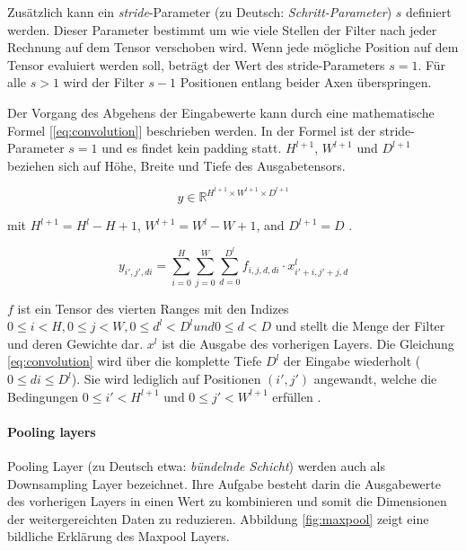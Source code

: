 Zusätzlich kann ein \textit{stride}-Parameter (zu Deutsch: \textit{Schritt-Parameter}) $s$ definiert werden. Dieser Parameter bestimmt um wie viele Stellen der Filter nach jeder Rechnung auf dem Tensor verschoben wird. Wenn jede mögliche Position auf dem Tensor evaluiert werden soll, beträgt der Wert des stride-Parameters $s=1$. Für alle $s > 1$ wird der Filter $s - 1$ Positionen entlang beider Axen überspringen.

Der Vorgang des Abgehens der Eingabewerte kann durch eine mathematische Formel [\ref{eq:convolution}] beschrieben werden. In der Formel ist der stride-Parameter $s=1$ und es findet kein padding statt. $H^{l+1}$, $W^{l+1}$ und $D^{l+1}$ beziehen sich auf Höhe, Breite und Tiefe des Ausgabetensors.
 
\begin{equation}
y \in \mathbb{R}^{H^{l+1} \times W^{l+1} \times D^{l+1}}
\end{equation}

mit $H^{l+1} = H^l - H + 1$, $W^{l+1} = W^l - W + 1$, and $D^{l+1} = D$ \parencite{Wu.2017}.


\begin{equation}
\label{eq:convolution}
y_{i',j',di} = \sum_{i=0}^{H}\sum_{j=0}^{W}\sum_{d =0}^{D^l} f_{i,j,d,di} \cdot x^{l}_{i'+i, j'+j, d}
\end{equation}

$f$ ist ein Tensor des vierten Ranges mit den Indizes $ 0 \leq i < H,0 \leq j < W, 0 \leq d^l < D^l und 0 \leq d < D$ und stellt die Menge der Filter und deren Gewichte dar. $x^l$ ist die Ausgabe des vorherigen Layers. Die Gleichung \ref{eq:convolution} wird \"uber die komplette Tiefe $D^l$ der Eingabe wiederholt ($0 \leq di \leq D^l$). Sie wird lediglich auf Positionen $(i',j')$ angewandt, welche die Bedingungen $0 \leq i' < H^{l + 1}$ und $0 \leq j' < W^{l + 1}$ erfüllen \parencite{Wu.2017}.

\paragraph{Pooling layers}

Pooling Layer (zu Deutsch etwa: \textit{bündelnde Schicht}) werden auch als Downsampling Layer bezeichnet. Ihre Aufgabe besteht darin die Ausgabewerte des vorherigen Layers in einen Wert zu kombinieren und somit die Dimensionen der weitergereichten Daten zu reduzieren. Abbildung \ref{fig:maxpool} zeigt eine bildliche Erklärung des Maxpool Layers.

